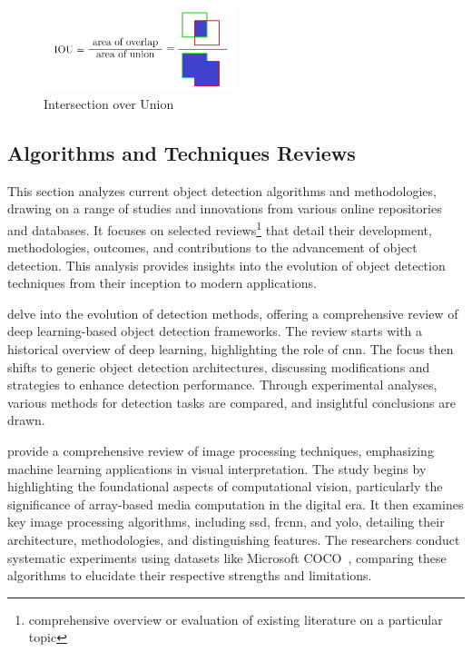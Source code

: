 \begin{figure}[h]
    \centering 
    \includegraphics[width=0.5\textwidth]{figs/iou.png} 
    \caption{Intersection over Union \cite{rfc25}}
    \label{fig:iou}
\end{figure}

\subsection{Algorithms and Techniques Reviews}
This section analyzes current object detection algorithms and methodologies, drawing on a range of studies and innovations from various online repositories and databases. It focuses on selected reviews\footnote{comprehensive overview or evaluation of existing literature on a particular topic} that detail their development, methodologies, outcomes, and contributions to the advancement of object detection. This analysis provides insights into the evolution of object detection techniques from their inception to modern applications.

\citet{rfc2} delve into the evolution of detection methods, offering a comprehensive review of deep learning-based object detection frameworks. The review starts with a historical overview of deep learning, highlighting the role of \ac{cnn}. The focus then shifts to generic object detection architectures, discussing modifications and strategies to enhance detection performance. Through experimental analyses, various methods for detection tasks are compared, and insightful conclusions are drawn.

\citet{rfc8} provide a comprehensive review of image processing techniques, emphasizing machine learning applications in visual interpretation. The study begins by highlighting the foundational aspects of computational vision, particularly the significance of array-based media computation in the digital era. It then examines key image processing algorithms, including \ac{ssd}, \ac{frcnn}, and \ac{yolo}, detailing their architecture, methodologies, and distinguishing features. The researchers conduct systematic experiments using datasets like Microsoft COCO~\cite{rfc16}, comparing these algorithms to elucidate their respective strengths and limitations.

